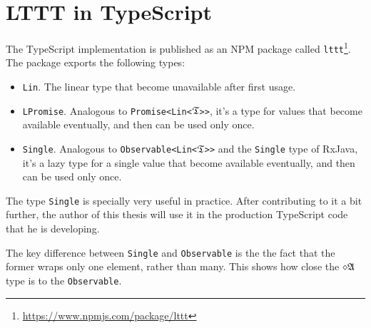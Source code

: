 \section{LTTT in TypeScript}

The TypeScript implementation is published as an NPM package called \texttt{lttt}\footnote{\url{https://www.npmjs.com/package/lttt}}. The package exports the following types:
\begin{itemize}
    \item \texttt{Lin}. The linear type that become unavailable after first usage.
    \item \texttt{LPromise}. Analogous to \texttt{Promise<Lin<}$\mathfrak{T}$\texttt{>{}>}, it's a type for values that become available eventually, and then can be used only once.
    \item \texttt{Single}. Analogous to \texttt{Observable<Lin<}$\mathfrak{T}$\texttt{>{}>} and the \texttt{Single} type of RxJava, it's a lazy type for a single value that become available eventually, and then can be used only once.
\end{itemize}

The type \texttt{Single} is specially very useful in practice. After contributing to it a bit further, the author of this thesis will use it in the production TypeScript code that he is developing.

The key difference between \texttt{Single} and \texttt{Observable} is the the fact that the former wraps only one element, rather than many. This shows how close the $\diamond\mathfrak{A}$ type is to the \texttt{Observable}.